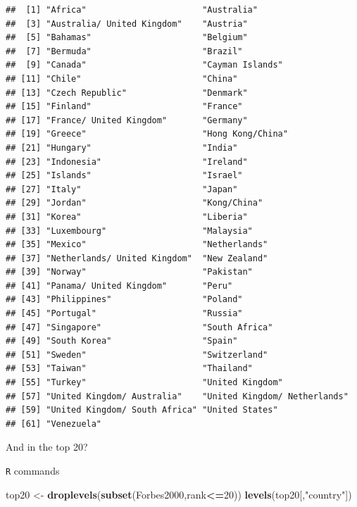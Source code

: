 \documentclass[]{book}
\newenvironment{Shaded}{\begin{snugshade}}{\end{snugshade}}
\newcommand{\KeywordTok}[1]{\textcolor[rgb]{0.13,0.29,0.53}{\textbf{#1}}}
\newcommand{\DecValTok}[1]{\textcolor[rgb]{0.00,0.00,0.81}{#1}}
\newcommand{\StringTok}[1]{\textcolor[rgb]{0.31,0.60,0.02}{#1}}
\newcommand{\OperatorTok}[1]{\textcolor[rgb]{0.81,0.36,0.00}{\textbf{#1}}}
\newcommand{\NormalTok}[1]{#1}
\begin{document}
\begin{verbatim}
##  [1] "Africa"                       "Australia"                   
##  [3] "Australia/ United Kingdom"    "Austria"                     
##  [5] "Bahamas"                      "Belgium"                     
##  [7] "Bermuda"                      "Brazil"                      
##  [9] "Canada"                       "Cayman Islands"              
## [11] "Chile"                        "China"                       
## [13] "Czech Republic"               "Denmark"                     
## [15] "Finland"                      "France"                      
## [17] "France/ United Kingdom"       "Germany"                     
## [19] "Greece"                       "Hong Kong/China"             
## [21] "Hungary"                      "India"                       
## [23] "Indonesia"                    "Ireland"                     
## [25] "Islands"                      "Israel"                      
## [27] "Italy"                        "Japan"                       
## [29] "Jordan"                       "Kong/China"                  
## [31] "Korea"                        "Liberia"                     
## [33] "Luxembourg"                   "Malaysia"                    
## [35] "Mexico"                       "Netherlands"                 
## [37] "Netherlands/ United Kingdom"  "New Zealand"                 
## [39] "Norway"                       "Pakistan"                    
## [41] "Panama/ United Kingdom"       "Peru"                        
## [43] "Philippines"                  "Poland"                      
## [45] "Portugal"                     "Russia"                      
## [47] "Singapore"                    "South Africa"                
## [49] "South Korea"                  "Spain"                       
## [51] "Sweden"                       "Switzerland"                 
## [53] "Taiwan"                       "Thailand"                    
## [55] "Turkey"                       "United Kingdom"              
## [57] "United Kingdom/ Australia"    "United Kingdom/ Netherlands" 
## [59] "United Kingdom/ South Africa" "United States"               
## [61] "Venezuela"
\end{verbatim}

And in the top 20?

\texttt{R} commands

\begin{Shaded}
\begin{Highlighting}[]
\NormalTok{top20 <-}\StringTok{ }\KeywordTok{droplevels}\NormalTok{(}\KeywordTok{subset}\NormalTok{(Forbes2000,rank}\OperatorTok{<=}\DecValTok{20}\NormalTok{))}
\KeywordTok{levels}\NormalTok{(top20[,}\StringTok{"country"}\NormalTok{])}
\end{Highlighting}
\end{Shaded}
\end{document}
